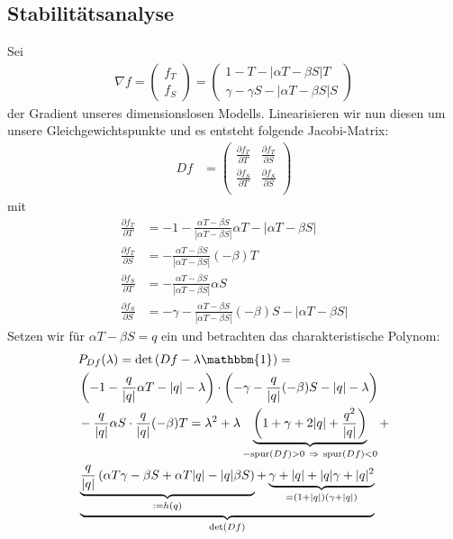 \documentclass[a4paper,twoside]{article}
\begin{document}
	\subsection{Stabilitätsanalyse}
	Sei
	\begin{align*}
		\nabla f = \left(\begin{array}{c}
			f_T \\
			f_S
		\end{array}\right) = \left(\begin{array}{c}
			1 - T - |\alpha T - \beta S|T \\
			\gamma - \gamma S - |\alpha T - \beta S|S
		\end{array}\right)
	\end{align*}
	der Gradient unseres dimensionslosen Modells. Linearisieren wir nun diesen um unsere Gleichgewichtspunkte und es entsteht folgende Jacobi-Matrix:
	\begin{align*}
		Df &= \left(\begin{array}{cc}
			\frac{\partial f_T}{\partial T} & \frac{\partial f_T}{\partial S} \\
			\frac{\partial f_S}{\partial T} & \frac{\partial f_S}{\partial S} \\
		\end{array}\right)
	\end{align*}
	mit
	\begin{align*}
		\frac{\partial f_T}{\partial T} &= -1 - \frac{\alpha T - \beta S}{|\alpha T - \beta S|}\alpha T - |\alpha T - \beta S| \\
		 \frac{\partial f_T}{\partial S} &= -\frac{\alpha T - \beta S}{|\alpha T - \beta S|}(-\beta) T \\
		 \frac{\partial f_S}{\partial T} &= -\frac{\alpha T - \beta S}{|\alpha T - \beta S|}\alpha S \\
		 \frac{\partial f_S}{\partial S} &= -\gamma -\frac{\alpha T - \beta S}{|\alpha T - \beta S|}(-\beta) S - |\alpha T - \beta S|
	\end{align*}
	Setzen wir für \(\alpha T - \beta S = q\) ein und betrachten das charakteristische Polynom:
	\begin{align*}
		&P_{Df}(\lambda) = \textrm{det}\left( Df - \lambda  \mathbbm{1} \right) = \\
		&\left(-1 - \frac{q}{|q|}\alpha T - |q| - \lambda\right) \cdot \left( -\gamma - \frac{q}{|q|}(-\beta) S - |q|- \lambda \right)\\
		& - \frac{q}{|q|}\alpha S \cdot  \frac{q}{|q|}(-\beta) T = 
		\lambda^2 + \lambda \underbrace{\left( 1  + \gamma + 2|q| + \frac{q^2}{|q|} \right)}_{-\textrm{spur}(Df) > 0 ~\Rightarrow~ \textrm{spur}(Df) < 0} + \\
		& \underbrace{
			\underbrace{\frac{q}{|q|}\left(\alpha T \gamma - \beta S + \alpha T |q| - |q|\beta S\right)}_{:=h(q)}
			 + \underbrace{\gamma + |q| + |q|\gamma + |q|^2}_{=(1 + |q|)(\gamma + |q|)}
		}_{\textrm{det}(Df)}
	\end{align*}
\end{document}
